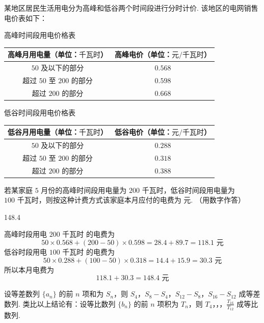 \begin{problem}
某地区居民生活用电分为高峰和低谷两个时间段进行分时计价. 该地区的电网销售电价表如下：

\begin{center}
高峰时间段用电价格表

\begin{tabular}{|c|c|}
\hline
高峰月用电量（单位：\(\text{千瓦时}\)） & 高峰电价（单位：\(\text{元}/\text{千瓦时}\)） \\
\hline
\(50\) 及以下的部分 & \(0.568\) \\
\hline
超过 \(50\) 至 \(200\) 的部分 & \(0.598\) \\
\hline
超过 \(200\) 的部分 & \(0.668\) \\
\hline
\end{tabular}

\vspace{0.8em}

低谷时间段用电价格表

\begin{tabular}{|c|c|}
\hline
低谷月用电量（单位：\(\text{千瓦时}\)） & 低谷电价（单位：\(\text{元}/\text{千瓦时}\)） \\
\hline
\(50\) 及以下的部分 & \(0.288\) \\
\hline
超过 \(50\) 至 \(200\) 的部分 & \(0.318\) \\
\hline
超过 \(200\) 的部分 & \(0.388\) \\
\hline
\end{tabular}
\end{center}

若某家庭 \(5\) 月份的高峰时间段用电量为 \(200\text{ 千瓦时}\)，低谷时间段用电量为 \(100\text{ 千瓦时}\)，则按这种计费方式该家庭本月应付的电费为\fillinblank{} \(\text{元}\). （用数字作答）
\end{problem}

\begin{answer}
148.4
\end{answer}

\begin{solution}
高峰时段用电 \(200\text{ 千瓦时}\) 的电费为
\[
50\times0.568+(200-50)\times0.598
=28.4+89.7=118.1\text{ 元}
\]
低谷时段用电 \(100\text{ 千瓦时}\) 的电费为
\[
50\times0.288+(100-50)\times0.318
=14.4+15.9=30.3\text{ 元}
\]
所以本月电费为
\[
118.1+30.3=148.4\text{ 元}
\]
\end{solution}

\begin{problem}
设等差数列 \(\{a_{n}\}\) 的前 \(n\) 项和为 \(S_{n}\)，则 \(S_{4}\)，\(S_{8} - S_{4}\)，\(S_{12} - S_{8}\)，\(S_{16} - S_{12}\) 成等差数列. 类比以上结论有：设等比数列 \(\{b_{n}\}\) 的前 \(n\) 项积为 \(T_{n}\)，则 \(T_{4}\)，\fillinblank{}，\fillinblank{}，\(\frac{T_{16}}{T_{12}}\) 成等比数列.
\end{problem}

